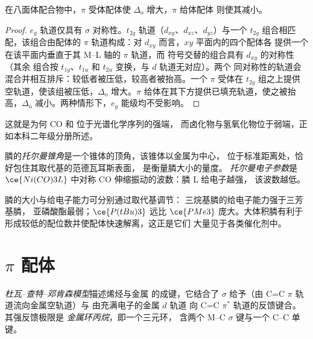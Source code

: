 \begin{proposition}[$\pi$ 相互作用与配体场分裂]\label{prop:b3:organometallic-bonding:pi-delta}
在八面体配合物中，$\pi$ 受体配体使 $\Delta_{\mathrm o}$ 增大，$\pi$ 给体配体
则使其减小。
\end{proposition}

\begin{proof}
$e_g$ 轨道仅具有 $\sigma$ 对称性。$t_{2g}$ 轨道（$d_{xy}$、$d_{xz}$、$d_{yz}$）与一个 $t_{2g}$
组合相匹配，该组合由配体的 $\pi$ 轨道构成：对 $d_{xy}$ 而言，$xy$ 平面内的四个配体各
提供一个在该平面内垂直于其 M--L 轴的 $\pi$ 轨道，而
符号交替的组合具有 $d_{xy}$ 的对称性（其余
组合按 $t_{1g}$、$t_{1u}$ 和 $t_{2u}$ 变换，与 $d$ 轨道无对应）。两个
同对称性的轨道会混合并相互排斥：较低者被压低，较高者被抬高。一个
$\pi$ 受体在 $t_{2g}$ 组之上提供空轨道，使该组被压低，$\Delta_{\mathrm o}$
增大。$\pi$ 给体在其下方提供已填充轨道，使之被抬高，$\Delta_{\mathrm o}$
减小。两种情形下，$e_g$ 能级均不受影响。
\end{proof}

这就是为何 CO 和  位于光谱化学序列的强端，
而卤化物与氢氧化物位于弱端，正如本科二年级分册所述。

\begin{definition}[托尔曼参数]\label{def:b3:organometallic-bonding:tolman}
膦的\emph{托尔曼锥角}是一个锥体的顶角，该锥体以金属为中心，
位于标准距离处，恰好包住其取代基的范德瓦耳斯表面，
是衡量膦大小的量度。
\emph{托尔曼电子参数}是
$\ce{Ni(CO)3L}$ 中对称 CO 伸缩振动的波数：膦 L 给电子越强，
该波数越低。
\end{definition}

膦的大小与给电子能力可分别通过取代基调节：
三烷基膦的给电子能力强于三芳基膦，
亚磷酸酯最弱；$\ce{P(tBu)3}$ 远比 $\ce{PMe3}$ 庞大。大体积膦有利于
形成较低的配位数并使配体快速解离，这正是它们
大量见于各类催化剂中。

\section{$\pi$ 配体}

\begin{definition}[杜瓦–查特–邓肯森模型]\label{def:b3:organometallic-bonding:dcd}
\emph{杜瓦–查特–邓肯森模型}描述烯烃与金属
的成键，它结合了 $\sigma$ 给予（由 C=C $\pi$ 轨道流向金属空轨道）与
由充满电子的金属 $d$ 轨道
向 C=C $\pi^*$ 轨道的反馈键合。其强反馈极限是
\emph{金属环丙烷}，即一个三元环，
含两个 M--C $\sigma$ 键与一个 C--C 单键。
\end{definition}

